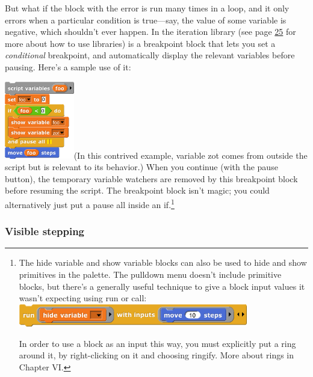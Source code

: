 But what if the block with the error is run many times in a loop, and it
only errors when a particular condition is true---say, the value of some
variable is negative, which shouldn't ever happen. In the iteration
library (see page \hyperref[libraries-1]{25} for more about how to use
libraries) is a breakpoint block that lets you set a \emph{conditional}
breakpoint, and automatically display the relevant variables before
pausing. Here's a sample use of it:

\includegraphics[width=1.19444in,height=1.33333in]{media/image119.png}(In
this contrived example, variable zot comes from outside the script but
is relevant to its behavior.) When you continue (with the pause button),
the temporary variable watchers are removed by this breakpoint block
before resuming the script. The breakpoint block isn't magic; you could
alternatively just put a pause all inside an if.\footnote{The hide
  variable and show variable blocks can also be used to hide and show
  primitives in the palette. The pulldown menu doesn't include primitive
  blocks, but there's a generally useful technique to give a block input
  values it wasn't expecting using run or
  call:\includegraphics[width=3.9375in,height=0.38889in]{media/image120.png}

  In order to use a block as an input this way, you must explicitly put
  a ring around it, by right-clicking on it and choosing ringify. More
  about rings in Chapter VI.}

\subsubsection{Visible stepping}\label{visible-stepping}

